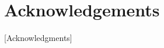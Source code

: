 
\cleartorecto %
\chapter{Acknowledgements} %
\thispagestyle{plain} %

[Acknowledgments]





























